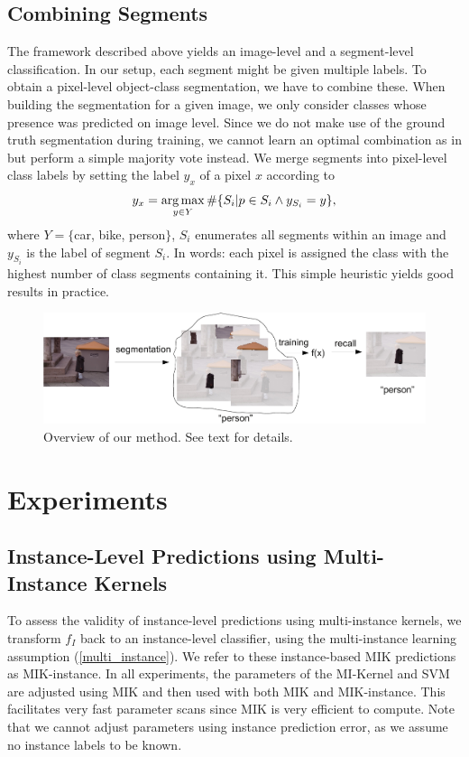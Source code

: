 \subsection{Combining Segments}
The framework described above yields an image-level and a segment-level classification.
In our setup, each segment might be given multiple labels. %
To obtain a pixel-level object-class segmentation, we have to combine these. 
When building the segmentation for a given image, we only consider classes whose presence was predicted on image level.
Since we do not make use of the ground truth segmentation during training, we cannot learn an optimal combination as 
in \citet{li2010object} but perform a simple majority vote instead.
We merge segments into pixel-level class labels by setting
the label $y_x$ of a pixel $x$ according to
\begin{equation}
    y_x = \operatorname*{arg\,max}_{y \in Y} \#\{S_i | p \in S_i \land y_{S_i}=y \},
\end{equation}
where $Y= \{$car, bike, person$ \}$, $S_i$ enumerates all segments within an %
image and $y_{S_i}$ is the label of segment $S_i$. In words: each pixel is
assigned the class with the highest number of class segments containing it.
This simple heuristic yields good results in practice.

\begin{figure}[tbp]
	\begin{center}
        \includegraphics[width=\linewidth]{images/scheme-crop.pdf}
	\end{center}
        \caption{Overview of our method. See text for details.}
\end{figure}
\section{Experiments}
\subsection{Instance-Level Predictions using Multi-Instance Kernels}
To assess the validity of instance-level predictions using multi-instance kernels, we transform $f_{I}$
back to an instance-level classifier, using the multi-instance learning
assumption (\eqref{multi_instance}). We refer to these instance-based MIK predictions
as MIK-instance. In all experiments, the parameters of the MI-Kernel
and SVM are adjusted using MIK and then used with both MIK and MIK-instance.
This facilitates very fast parameter scans since MIK is very efficient to
compute. Note that we cannot adjust parameters using instance prediction error, as we assume
no instance labels to be known.

